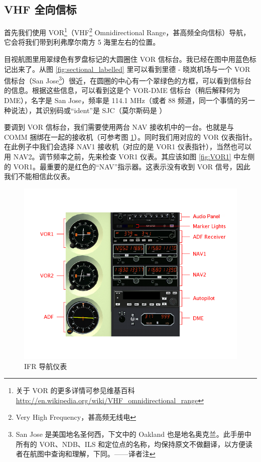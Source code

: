 \subsection{VHF 全向信标}

首先我们使用 VOR\footnote{关于 VOR 的更多详情可参见维基百科 \url{http://en.wikipedia.org/wiki/VHF_omnidirectional_range}}（VHF\footnote{Very High Frequency，甚高频无线电} Omnidirectional Range，甚高频全向信标）导航，它会将我们带到利弗摩尔南方 5 海里左右的位置。

目视航图里用翠绿色有罗盘标记的大圆圈住 VOR 信标台。我已经在图中用蓝色标记出来了。从图 \ref{fig:sectional_labelled} 里可以看到里德 - 晓岚机场与一个 VOR 信标台（San Jose\footnote{San Jose 是美国地名圣何西，下文中的 Oakland 也是地名奥克兰。此手册中所有的 VOR、NDB、ILS 和定位点的名称，均保持原文不做翻译，以方便读者在航图中查询和理解，下同。——译者注}）很近，在圆圈的中心有一个翠绿色的方框，可以看到信标台的信息。根据这些信息，可以看到这是个 VOR-DME 信标台（稍后解释何为 DME），名字是 San Jose，频率是 114.1 MHz（或者 88 频道，同一个事情的另一种说法），其识别码或“ident”是 SJC（莫尔斯码是 \mdot\mdot\mdot\mspace\mdot\mdash\mdash\mdash\mspace \mdash\mdot\mdash\mdot）

要调到 VOR 信标台，我们需要使用两台 NAV 接收机中的一台。也就是与 COMM 捆绑在一起的接收机（可参考图 \ref{fig:panel}）。同时我们用对应的 VOR 仪表指针。在此例子中我们会选择 NAV1 接收机（对应的是 VOR1 仪表指针），当然也可以用 NAV2。调节频率之前，先来检查 VOR1 仪表。其应该如图 \ref{fig:VOR1} 中左侧的 VOR1。最重要的是红色的“NAV”指示器。这表示没有收到 VOR 信号，因此我们不能相信此仪表。

\begin{figure}
  \begin{center}
    \includegraphics[width=12cm]{img/panel_labelled}
    \caption{IFR 导航仪表}
    \label{fig:panel}
  \end{center}
\end{figure}

